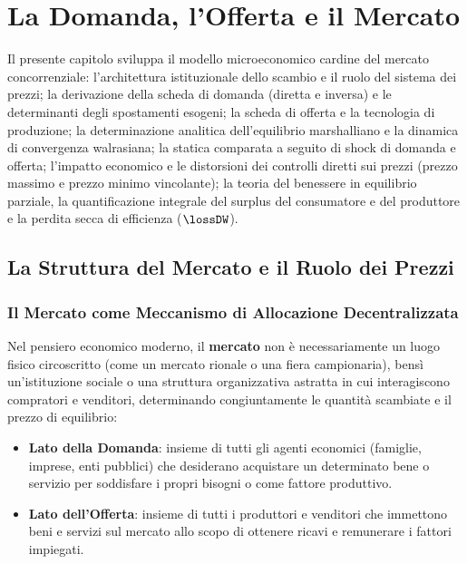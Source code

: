 \chapter{La Domanda, l'Offerta e il Mercato}
\label{chap:domanda_offerta_mercato}

\begin{tcolorbox}[colback=navyblue!5!white, colframe=navyblue, title=\textbf{Quadro Concettuale e Obiettivi Didattici}]
Il presente capitolo sviluppa il modello microeconomico cardine del mercato concorrenziale: l'architettura istituzionale dello scambio e il ruolo del sistema dei prezzi; la derivazione della scheda di domanda (diretta e inversa) e le determinanti degli spostamenti esogeni; la scheda di offerta e la tecnologia di produzione; la determinazione analitica dell'equilibrio marshalliano e la dinamica di convergenza walrasiana; la statica comparata a seguito di shock di domanda e offerta; l'impatto economico e le distorsioni dei controlli diretti sui prezzi (prezzo massimo e prezzo minimo vincolante); la teoria del benessere in equilibrio parziale, la quantificazione integrale del surplus del consumatore e del produttore e la perdita secca di efficienza ($\lossDW$).
\end{tcolorbox}

\section{La Struttura del Mercato e il Ruolo dei Prezzi}

\subsection{Il Mercato come Meccanismo di Allocazione Decentralizzata}
Nel pensiero economico moderno, il \textbf{mercato} non è necessariamente un luogo fisico circoscritto (come un mercato rionale o una fiera campionaria), bensì un'istituzione sociale o una struttura organizzativa astratta in cui interagiscono compratori e venditori, determinando congiuntamente le quantità scambiate e il prezzo di equilibrio:
\begin{itemize}
    \item \textbf{Lato della Domanda}: insieme di tutti gli agenti economici (famiglie, imprese, enti pubblici) che desiderano acquistare un determinato bene o servizio per soddisfare i propri bisogni o come fattore produttivo.
    \item \textbf{Lato dell'Offerta}: insieme di tutti i produttori e venditori che immettono beni e servizi sul mercato allo scopo di ottenere ricavi e remunerare i fattori impiegati.
\end{itemize}

